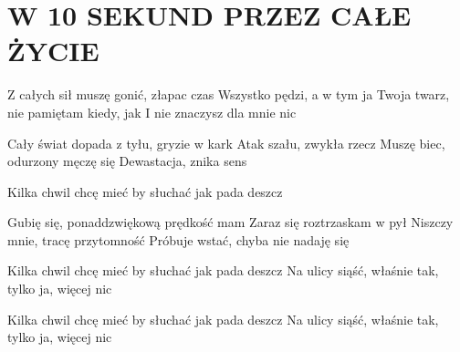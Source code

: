 \documentclass[../../../songbook.tex]{subfiles}
\begin{document}
\TabPositions{10cm} %
\section*{W 10 SEKUND PRZEZ CAŁE ŻYCIE}
{}
\vspace{0.5cm}
Z całych sił muszę gonić, złapac czas		 \newline
Wszystko pędzi, a w tym ja				\newline
Twoja twarz, nie pamiętam kiedy, jak				\newline
I nie znaczysz dla mnie nic				\newline

Cały świat dopada z tyłu, gryzie w kark				\newline
Atak szału, zwykła rzecz				\newline
Muszę biec, odurzony męczę się				\newline
Dewastacja, znika sens				\newline

\-\hspace{1cm} Kilka chwil chcę mieć by słuchać jak pada deszcz \newline

Gubię się, ponaddzwiękową prędkość mam				\newline
Zaraz się roztrzaskam w pył				\newline
Niszczy mnie, tracę przytomność				\newline
Próbuje wstać, chyba nie nadaję się				\newline

\-\hspace{1cm} Kilka chwil chcę mieć by słuchać jak pada deszcz  \newline
\-\hspace{1cm} Na ulicy siąść, właśnie tak, tylko ja, więcej nic  \newline

\-\hspace{1cm} Kilka chwil chcę mieć by słuchać jak pada deszcz				\newline
\-\hspace{1cm} Na ulicy siąść, właśnie tak, tylko ja, więcej nic 				\newline
\end{document}
